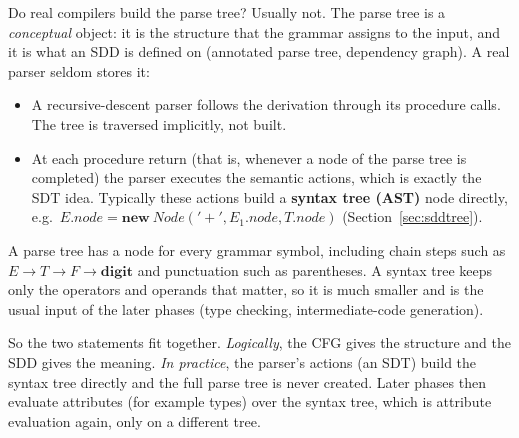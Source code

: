 \documentclass[11pt,a4paper]{article}
\newcommand{\at}[2]{\ensuremath{#1.\mathit{#2}}}
\newcommand{\tok}[1]{\ensuremath{\mathtt{#1}}}
\begin{document}
\begin{notebox}{Do real compilers build the parse tree?}
Usually not. The parse tree is a \emph{conceptual} object: it is the structure that the grammar assigns to the input, and it is what an SDD is defined on (annotated parse tree, dependency graph). A real parser seldom stores it:
\begin{itemize}[nosep]
\item A recursive-descent parser follows the derivation through its procedure calls. The tree is traversed implicitly, not built.
\item At each procedure return (that is, whenever a node of the parse tree is completed) the parser executes the semantic actions, which is exactly the SDT idea. Typically these actions build a \textbf{syntax tree (AST)} node directly, e.g.\ $\at{E}{node}=\mathbf{new}\ \mathit{Node}(\tok{'+'},\at{E_1}{node},\at{T}{node})$ (Section~\ref{sec:sddtree}).
\end{itemize}
A parse tree has a node for every grammar symbol, including chain steps such as $E\to T\to F\to\mathbf{digit}$ and punctuation such as parentheses. A syntax tree keeps only the operators and operands that matter, so it is much smaller and is the usual input of the later phases (type checking, intermediate-code generation).

So the two statements fit together. \emph{Logically}, the CFG gives the structure and the SDD gives the meaning. \emph{In practice}, the parser's actions (an SDT) build the syntax tree directly and the full parse tree is never created. Later phases then evaluate attributes (for example types) over the syntax tree, which is attribute evaluation again, only on a different tree.
\end{notebox}
\end{document}
